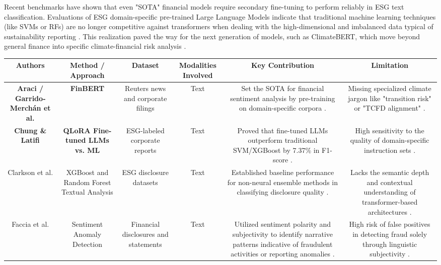\documentclass{article}
\begin{document}
Recent benchmarks have shown that even "SOTA" financial models require secondary fine-tuning to perform reliably in ESG text classification. Evaluations of ESG domain-specific pre-trained Large Language Models indicate that traditional machine learning techniques (like SVMs or RFs) are no longer competitive against transformers when dealing with the high-dimensional and imbalanced data typical of sustainability reporting  \parencite{tae_sun_chung_e16a4c18}. This realization paved the way for the next generation of models, such as ClimateBERT, which move beyond general finance into specific climate-financial risk analysis  \parencite{julia_bingler_268445e3}.
\begin{table}[h!]
\centering
\begin{tabular}{|c|c|c|c|c|c|}
\hline
Authors & Method / Approach & Dataset & Modalities Involved & Key Contribution & Limitation \\ \hline
\textbf{Araci / Garrido‐Merchán et al.} & \textbf{FinBERT}  \parencite{eduardo_c__garrido_merch_n_5c6b0bfa} & Reuters news and corporate filings  \parencite{obaid_ur_rehman_qureshi_3a75aeb7} & Text & Set the SOTA for financial sentiment analysis by pre-training on domain-specific corpora  \parencite{eduardo_c__garrido_merch_n_5c6b0bfa}. & Missing specialized climate jargon like "transition risk" or "TCFD alignment"  \parencite{yinan_yu_e282fd98}. \\ \hline
\textbf{Chung \& Latifi}  \parencite{tae_sun_chung_e16a4c18} & \textbf{QLoRA Fine-tuned LLMs vs. ML} & ESG-labeled corporate reports & Text & Proved that fine-tuned LLMs outperform traditional SVM/XGBoost by 7.37\% in F1-score  \parencite{tae_sun_chung_e16a4c18}. & High sensitivity to the quality of domain-specific instruction sets  \parencite{tae_sun_chung_e16a4c18}. \\ \hline
Clarkson et al.  \parencite{tristan_lim_a866987c} & XGBoost and Random Forest Textual Analysis & ESG disclosure datasets  \parencite{tristan_lim_a866987c} & Text & Established baseline performance for non-neural ensemble methods in classifying disclosure quality  \parencite{tristan_lim_a866987c}. & Lacks the semantic depth and contextual understanding of transformer-based architectures  \parencite{tristan_lim_a866987c}. \\ \hline
Faccia et al.  \parencite{adedoyin_tolulope_oyewole_b2f3f1c1} & Sentiment Anomaly Detection & Financial disclosures and statements  \parencite{adedoyin_tolulope_oyewole_b2f3f1c1} & Text & Utilized sentiment polarity and subjectivity to identify narrative patterns indicative of fraudulent activities or reporting anomalies  \parencite{adedoyin_tolulope_oyewole_b2f3f1c1}. & High risk of false positives in detecting fraud solely through linguistic subjectivity  \parencite{adedoyin_tolulope_oyewole_b2f3f1c1}. \\ \hline

\end{tabular}
\end{table}
\end{document}
